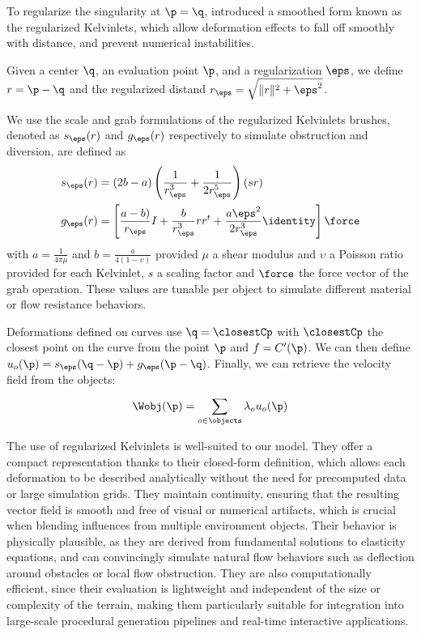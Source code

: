 To regularize the singularity at $\p = \q$, \cite{DeGoes2017} introduced a smoothed form known as the regularized Kelvinlets, which allow deformation effects to fall off smoothly with distance, and prevent numerical instabilities.

Given a center $\q$, an evaluation point $\p$, and a regularization $\eps$, we define $r = \p - \q$ and the regularized distand $r_{\eps} = \sqrt{\|r\|^2 + \eps^2}$.

We use the scale and grab formulations of the regularized Kelvinlets brushes, denoted as $s_\eps(r)$ and $g_\eps(r)$ respectively to simulate obstruction and diversion, are defined as
\begin{align*}
    s_\eps(r) &= (2b - a) \left( \frac{1}{r_\eps^3} + \frac{1}{2r_\eps^5} \right)(s r) \\
    g_\eps(r) &= \left[ \frac{a - b)}{r_\eps}I + \frac{b}{r_\eps^3} r r^t + 
\frac{a \eps^2}{2 r_\eps^3} \identity \right] \force
\end{align*}
with $a = \frac{1}{4 \pi \mu}$ and $b = \frac{a}{4 (1 - \upsilon)}$ provided $\mu$ a shear modulus and $\upsilon$ a Poisson ratio provided for each Kelvinlet, $s$ a scaling factor and $\force$ the force vector of the grab operation. These values are tunable per object to simulate different material or flow resistance behaviors.

Deformations defined on curves use $\q = \closestCp$ with $\closestCp$ the closest point on the curve from the point $\p$ and $f = C'(\p)$. We can then define $u_o(\p) = s_\eps(\q - \p) + g_\eps(\p - \q)$.
Finally, we can retrieve the velocity field from the objects:
\begin{align*}
    \Wobj(\p) = \sum_{o \in \objects}^{}{\lambda_o u_o(\p)}
\end{align*}

The use of regularized Kelvinlets is well-suited to our model. They offer a compact representation thanks to their closed-form definition, which allows each deformation to be described analytically without the need for precomputed data or large simulation grids. They maintain continuity, ensuring that the resulting vector field is smooth and free of visual or numerical artifacts, which is crucial when blending influences from multiple environment objects. Their behavior is physically plausible, as they are derived from fundamental solutions to elasticity equations, and can convincingly simulate natural flow behaviors such as deflection around obstacles or local flow obstruction. They are also computationally efficient, since their evaluation is lightweight and independent of the size or complexity of the terrain, making them particularly suitable for integration into large-scale procedural generation pipelines and real-time interactive applications.



